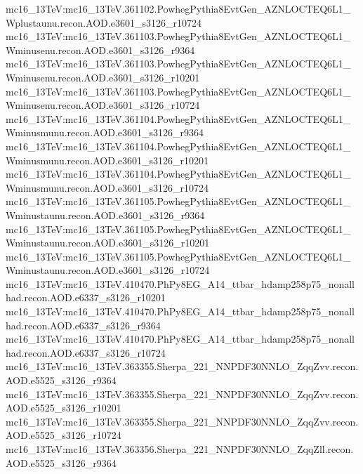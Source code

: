 { mc16\_13TeV:mc16\_13TeV.361102.PowhegPythia8EvtGen\_AZNLOCTEQ6L1\_Wplustaunu.recon.AOD.e3601\_s3126\_r10724\newline    
 mc16\_13TeV:mc16\_13TeV.361103.PowhegPythia8EvtGen\_AZNLOCTEQ6L1\_Wminusenu.recon.AOD.e3601\_s3126\_r9364\newline    
 mc16\_13TeV:mc16\_13TeV.361103.PowhegPythia8EvtGen\_AZNLOCTEQ6L1\_Wminusenu.recon.AOD.e3601\_s3126\_r10201\newline    
 mc16\_13TeV:mc16\_13TeV.361103.PowhegPythia8EvtGen\_AZNLOCTEQ6L1\_Wminusenu.recon.AOD.e3601\_s3126\_r10724\newline    
 mc16\_13TeV:mc16\_13TeV.361104.PowhegPythia8EvtGen\_AZNLOCTEQ6L1\_Wminusmunu.recon.AOD.e3601\_s3126\_r9364\newline    
 mc16\_13TeV:mc16\_13TeV.361104.PowhegPythia8EvtGen\_AZNLOCTEQ6L1\_Wminusmunu.recon.AOD.e3601\_s3126\_r10201\newline    
 mc16\_13TeV:mc16\_13TeV.361104.PowhegPythia8EvtGen\_AZNLOCTEQ6L1\_Wminusmunu.recon.AOD.e3601\_s3126\_r10724\newline    
 mc16\_13TeV:mc16\_13TeV.361105.PowhegPythia8EvtGen\_AZNLOCTEQ6L1\_Wminustaunu.recon.AOD.e3601\_s3126\_r9364\newline    
 mc16\_13TeV:mc16\_13TeV.361105.PowhegPythia8EvtGen\_AZNLOCTEQ6L1\_Wminustaunu.recon.AOD.e3601\_s3126\_r10201\newline    
 mc16\_13TeV:mc16\_13TeV.361105.PowhegPythia8EvtGen\_AZNLOCTEQ6L1\_Wminustaunu.recon.AOD.e3601\_s3126\_r10724\newline    
 mc16\_13TeV:mc16\_13TeV.410470.PhPy8EG\_A14\_ttbar\_hdamp258p75\_nonallhad.recon.AOD.e6337\_s3126\_r10201\newline    
 mc16\_13TeV:mc16\_13TeV.410470.PhPy8EG\_A14\_ttbar\_hdamp258p75\_nonallhad.recon.AOD.e6337\_s3126\_r9364\newline    
 mc16\_13TeV:mc16\_13TeV.410470.PhPy8EG\_A14\_ttbar\_hdamp258p75\_nonallhad.recon.AOD.e6337\_s3126\_r10724\newline    
 mc16\_13TeV:mc16\_13TeV.363355.Sherpa\_221\_NNPDF30NNLO\_ZqqZvv.recon.AOD.e5525\_s3126\_r9364\newline    
 mc16\_13TeV:mc16\_13TeV.363355.Sherpa\_221\_NNPDF30NNLO\_ZqqZvv.recon.AOD.e5525\_s3126\_r10201\newline    
 mc16\_13TeV:mc16\_13TeV.363355.Sherpa\_221\_NNPDF30NNLO\_ZqqZvv.recon.AOD.e5525\_s3126\_r10724\newline    
 mc16\_13TeV:mc16\_13TeV.363356.Sherpa\_221\_NNPDF30NNLO\_ZqqZll.recon.AOD.e5525\_s3126\_r9364\newline    
}
